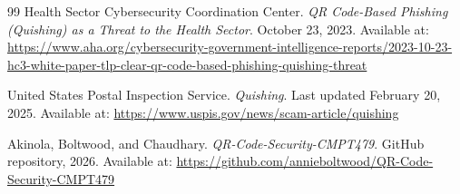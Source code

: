 \documentclass[11pt]{article}
\begin{document}
\begin{thebibliography}{99}
Health Sector Cybersecurity Coordination Center.
\newblock \emph{QR Code-Based Phishing (Quishing) as a Threat to the Health Sector}.
\newblock October 23, 2023.
\newblock Available at: \url{https://www.aha.org/cybersecurity-government-intelligence-reports/2023-10-23-hc3-white-paper-tlp-clear-qr-code-based-phishing-quishing-threat}

United States Postal Inspection Service.
\newblock \emph{Quishing}.
\newblock Last updated February 20, 2025.
\newblock Available at: \url{https://www.uspis.gov/news/scam-article/quishing}

Akinola, Boltwood, and Chaudhary.
\newblock \emph{QR-Code-Security-CMPT479}.
\newblock GitHub repository, 2026.
\newblock Available at: \url{https://github.com/annieboltwood/QR-Code-Security-CMPT479}

\end{thebibliography}
\end{document}

